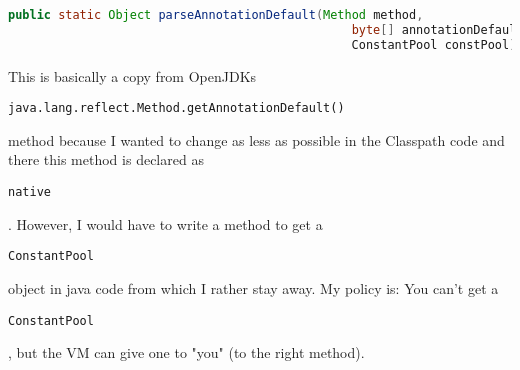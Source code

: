 \documentclass[a4paper, 10pt, titlepage]{scrartcl} %
\begin{document}
\begin{lstlisting}[language=Java,firstnumber=111]
    public static Object parseAnnotationDefault(Method method,
                                                byte[] annotationDefault,
                                                ConstantPool constPool)
\end{lstlisting}
This is basically a copy from OpenJDKs
\begin{scriptsize}\verb|java|\hspace{0.0pt}\verb|.|\hspace{0.0pt}\verb|lang|\hspace{0.0pt}\verb|.|\hspace{0.0pt}\verb|reflect|\hspace{0.0pt}\verb|.|\hspace{0.0pt}\verb|Method|\hspace{0.0pt}\verb|.|\hspace{0.0pt}\verb|getAnnotationDefault|\hspace{0.0pt}\verb|(|\hspace{0.0pt}\verb||\hspace{0.0pt}\verb|)|\hspace{0.0pt}\verb||\end{scriptsize} method because I wanted
to change as less as possible in the Classpath code and there this method is
declared as \begin{scriptsize}\verb|native|\end{scriptsize}. However, I would have to write a method to get a
\begin{scriptsize}\verb|ConstantPool|\end{scriptsize} object in java code from which I rather stay away. My policy
is: You can't get a \begin{scriptsize}\verb|ConstantPool|\end{scriptsize}, but the VM can give one to "you" (to the
right method).
\end{document}
